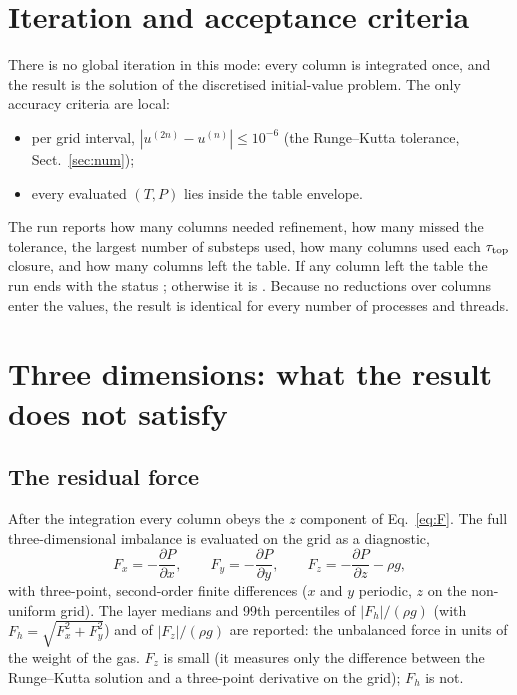 \section{Iteration and acceptance criteria}
There is no global iteration in this mode: every column is integrated once, and the result is the solution of the
discretised initial-value problem. The only accuracy criteria are local:
\begin{itemize}
\item per grid interval, $|u^{(2n)}-u^{(n)}|\le10^{-6}$ (the Runge--Kutta tolerance, Sect.~\ref{sec:num});
\item every evaluated $(T,P)$ lies inside the table envelope.
\end{itemize}
The run reports how many columns needed refinement, how many missed the tolerance, the largest number of substeps used,
how many columns used each $\tau_{\rm top}$ closure, and how many columns left the table. If any column left the table the
run ends with the status ; otherwise it is . Because no reductions over columns enter the
values, the result is identical for every number of processes and threads.

\section{Three dimensions: what the result does not satisfy}\label{sec:3d}
\subsection{The residual force}
After the integration every column obeys the $z$ component of Eq.~\eqref{eq:F}. The full three-dimensional imbalance is
evaluated on the grid as a diagnostic,
\begin{equation}
F_x=-\frac{\partial P}{\partial x},\qquad F_y=-\frac{\partial P}{\partial y},\qquad F_z=-\frac{\partial P}{\partial z}-\rho g ,
\end{equation}
with three-point, second-order finite differences ($x$ and $y$ periodic, $z$ on the non-uniform grid). The layer medians
and 99th percentiles of $|F_h|/(\rho g)$ (with $F_h=\sqrt{F_x^2+F_y^2}$) and of $|F_z|/(\rho g)$ are reported: the
unbalanced force in units of the weight of the gas. $F_z$ is small (it measures only the difference between the
Runge--Kutta solution and a three-point derivative on the grid); $F_h$ is not.

